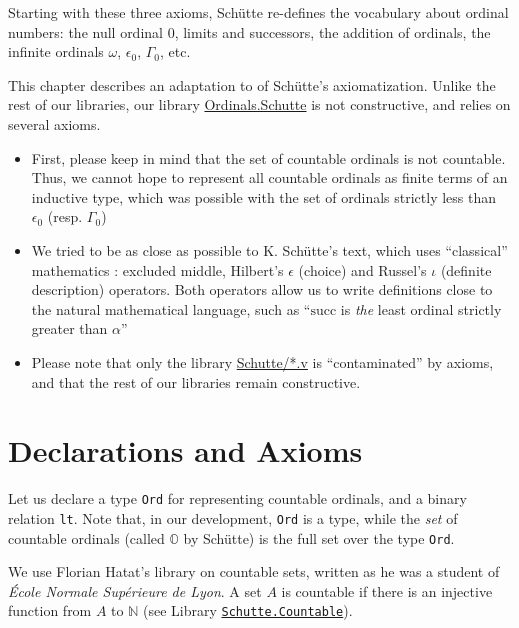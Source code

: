 \documentclass[a4paper]{book}
\begin{document}
Starting with these three axioms, Schütte re-defines the vocabulary about ordinal numbers: the null ordinal $0$, limits and successors, the addition of ordinals, the infinite ordinals $\omega$, $\epsilon_0$, $\Gamma_0$, etc.

This chapter describes an adaptation to \coq{} of Schütte's axiomatization. 
 Unlike the rest of our libraries, our library
\href{../src/html/hydras.Schutte.Schutte.html}{Ordinals.Schutte}
is not constructive, and relies on several axioms.

\begin{itemize}
\item First, please keep in mind  that the set of countable ordinals is not countable. Thus, we cannot hope to represent all countable ordinals as finite terms of an inductive type, which was possible with  the set of ordinals strictly less than $\epsilon_0$ (resp. $\Gamma_0$)
\item We tried to be as close as possible to K. Schütte's text, which uses ``classical'' mathematics : excluded middle, Hilbert's $\epsilon$ (choice) and Russel's $\iota$ (definite description) operators. Both operators allow us to write definitions close to the natural mathematical language, such as ``$\textrm{succ}$ is \emph{the} least ordinal strictly greater than $\alpha$''
\item Please note that only the library \href{../src/html/hydras.Schutte.Schutte.html}{Schutte/*.v} is ``contaminated'' by axioms, and that the rest of our libraries remain constructive.
\end{itemize}

\section{Declarations and Axioms}

Let us declare a type 
\texttt{Ord} for representing countable ordinals, and a binary relation
 \texttt{lt}. Note that, in our development, \texttt{Ord} is a type, while the \emph{set} of countable ordinals (called $\mathbb{O}$ by Schütte) 
is the full set over the type \texttt{Ord}.

\label{types:Ord} 

We use Florian Hatat's library on countable sets, written as he was a student of  \emph{\'Ecole Normale Supérieure de Lyon}. A set $A$ is countable if there is an injective function from $A$ to $\mathbb{N}$ (see 
Library \href{../src/html/hydras.Schutte.Countable.html}%
{\texttt{Schutte.Countable}}).
\end{document}

